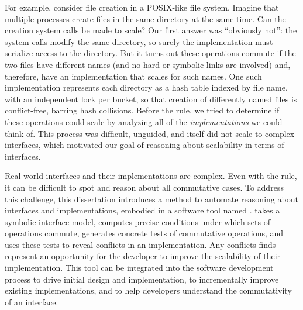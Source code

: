 For example,
consider file creation in a POSIX-like file system. Imagine that
multiple processes create files in the same directory at the same
time. Can the creation system calls be made to scale? Our
first answer was ``obviously not'': the system calls modify the same
directory, so surely the implementation must
serialize access to the directory. But it turns
out these operations commute if the two files have different names
(and no hard or symbolic links are involved) and, therefore, have an
implementation that scales for such names.
One such implementation represents each directory as a hash table
indexed by file name, with an independent lock per bucket,
so that creation of differently named files is conflict-free, barring
hash collisions.
%
Before the rule, we tried to determine if these
operations could scale by analyzing all of the \emph{implementations}
we could think
of.  This process was difficult, unguided, and itself did not scale to
complex interfaces, which
motivated our goal of reasoning about
scalability in terms of interfaces.


Real-world interfaces and their implementations are complex.
Even with the rule, it can be difficult to spot and
reason about all commutative cases.
%
%
To address this challenge, this dissertation introduces a method to
automate reasoning about interfaces and implementations, embodied in a
software tool named \tool.
%
\tool takes a symbolic interface model,
computes precise conditions under which sets of operations commute,
generates concrete tests of commutative operations,
and uses these tests to reveal conflicts in an implementation.
%
Any conflicts \tool finds represent an opportunity for the developer
to improve the scalability of their implementation.
%
This tool can be
integrated into the software development process to drive initial design and
implementation, to incrementally improve existing implementations, and to
help developers understand the commutativity of an interface.

